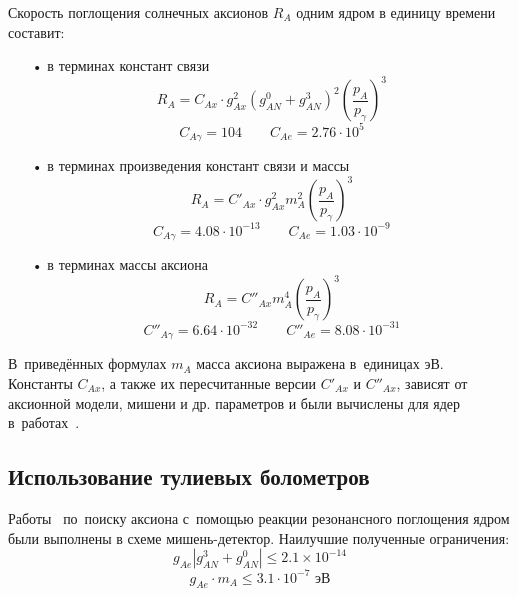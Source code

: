 \documentclass[a4paper,article,14pt]{extarticle}
\begin{document}
Скорость поглощения солнечных аксионов $R_A$ одним ядром {\Tm} в единицу времени составит:
\begin{itemize}
    \item[•] в терминах констант связи
    \begin{equation}\label{RAg1}
        {R_A} = {C_{Ax}} \cdot g_{Ax}^2{\left( {g_{AN}^0 + g_{AN}^3} \right)^2}{\left( {\frac{{{p_A}}}{{{p_\gamma }}}} \right)^3}
    \end{equation}
    \begin{equation}
        C_{A\gamma } = 104 \qquad C_{Ae} = 2.76 \cdot {10^5}
    \end{equation}
    \item[•] в терминах произведения констант связи и массы
    \begin{equation}\label{RAg}
        {R_A} = {C'_{Ax}} \cdot g_{Ax}^2 m_A^2{\left( {\frac{{{p_A}}}{{{p_\gamma }}}} \right)^3}
    \end{equation}
    \begin{equation}
        C_{A\gamma } = 4.08 \cdot {10^{-13}} \qquad C_{Ae} = 1.03 \cdot {10^{-9}}
    \end{equation}
    \item[•] в терминах массы аксиона
    \begin{equation}
    \label{RAm}
    {R_A} = {C''_{Ax}}m_A^4{\left( {\frac{{{p_A}}}{{{p_\gamma }}}} \right)^3}
\end{equation}
\begin{equation}
    C''_{A\gamma } = 6.64 \cdot 10^{-32} \qquad
    C''_{Ae} = 8.08 \cdot 10^{-31}
    \end{equation}
\end{itemize}
В~приведённых формулах $m_A$ масса аксиона выражена в~единицах эВ.
Константы $C_{Ax}$, а также их пересчитанные версии $C'_{Ax }$ и $C''_{Ax }$, зависят от аксионной модели, мишени и др. параметров и были вычислены для ядер {\Tm} в~работах~\cite{Derbin2009,redondo2013solar}.

\subsection{Использование тулиевых  болометров}
Работы~\cite{Derbin2007,Derbin2009,derbin2011constraints} по~поиску аксиона с~помощью реакции резонансного поглощения ядром {\Tm} были выполнены в схеме мишень-детектор. Наилучшие полученные ограничения:
\begin{equation}
    {g_{Ae }}\left| {g_{AN}^3 + g_{AN}^0} \right| \leqslant
        2.1 \times {10^{-14}}
\end{equation}
\begin{equation}
{g_{Ae }} \cdot {m_A} \leqslant 3.1 \cdot {10^{ - 7}} \text{ эВ}
\end{equation}
\end{document}
